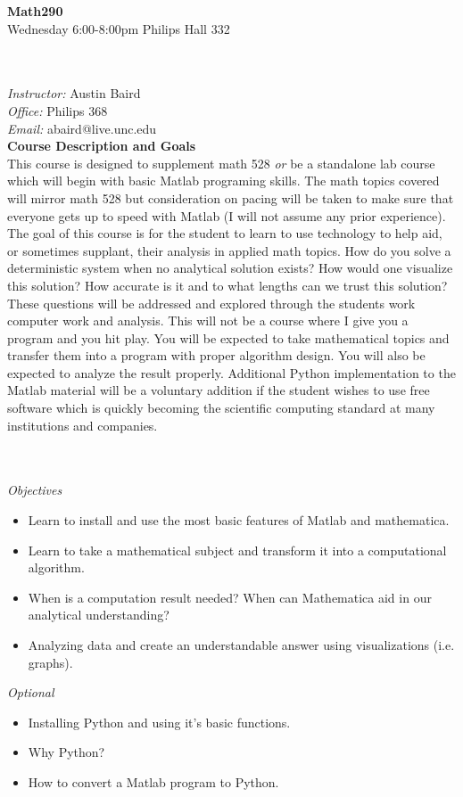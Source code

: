 \documentclass[11pt]{article}
\begin{document}
\begin{center}
{\bf Math290} \\
Wednesday 6:00-8:00pm Philips Hall 332 \\
\end{center}
\ \\
\ \\

\noindent\emph {Instructor:} Austin Baird\\
\emph {Office:} Philips 368 \\
\emph {Email: } abaird@live.unc.edu\\


{\bf Course Description and Goals}\\

This course is designed to supplement math 528 \textit{or} be a standalone lab course which will begin with basic Matlab programing skills. The math topics covered will mirror math 528 but consideration on pacing will be taken to make sure that everyone gets up to speed with Matlab (I will not assume any prior experience). The goal of this course is for the student to learn to use technology to help aid, or sometimes supplant, their analysis in applied math topics. How do you solve a deterministic system when no analytical solution exists? How would one visualize this solution? How accurate is it and to what lengths can we trust this solution? These questions will be addressed and explored through the students work computer work and analysis. This will not be a course where I give you a program and you hit play. You will be expected to take mathematical topics and transfer them into a program with proper algorithm design. You will also be expected to analyze the result properly. Additional Python implementation to the Matlab material will be a voluntary addition if the student wishes to use free software which is quickly becoming the scientific computing standard at many institutions and companies. 

\ \\
\ \\

\emph{Objectives}
\ \\
\begin{itemize}
\item Learn to install and use the most basic features of Matlab and mathematica.
\item Learn to take a mathematical subject and transform it into a computational algorithm. 
\item When is a computation result needed? When can Mathematica aid in our analytical understanding?
\item Analyzing data and create an understandable answer using visualizations (i.e. graphs). 
\end{itemize}
\noindent \textit{Optional}
\begin{itemize}
\item Installing Python and using it's basic functions.
\item Why Python? 
\item How to convert a Matlab program to Python. 
\end{itemize}
\end{document}
